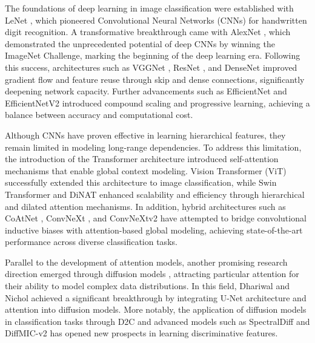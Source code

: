 \documentclass[a4paper,fleqn]{cas-sc}
\begin{document}
The foundations of deep learning in image classification were established with LeNet \cite{lecun2002gradient}, which pioneered Convolutional Neural Networks (CNNs) for handwritten digit recognition. A transformative breakthrough came with AlexNet \cite{krizhevsky2012imagenet}, which demonstrated the unprecedented potential of deep CNNs by winning the ImageNet Challenge, marking the beginning of the deep learning era. Following this success, architectures such as VGGNet \cite{donelly2012very}, ResNet \cite{he2016deep}, and DenseNet \cite{huang2017densely} improved gradient flow and feature reuse through skip and dense connections, significantly deepening network capacity. Further advancements such as EfficientNet \cite{tan2019efficientnet} and EfficientNetV2 \cite{tan2021efficientnetv2} introduced compound scaling and progressive learning, achieving a balance between accuracy and computational cost.

Although CNNs have proven effective in learning hierarchical features, they remain limited in modeling long-range dependencies. To address this limitation, the introduction of the Transformer architecture \cite{vaswani2017attention} introduced self-attention mechanisms that enable global context modeling. Vision Transformer (ViT) \cite{dosovitskiy2021an} successfully extended this architecture to image classification, while Swin Transformer \cite{liu2021swin} and DiNAT \cite{hussein2023dilated} enhanced scalability and efficiency through hierarchical and dilated attention mechanisms. In addition, hybrid architectures such as CoAtNet \cite{dai2021coatnet}, ConvNeXt \cite{liu2022convnet}, and ConvNeXtv2 \cite{woo2023convnext} have attempted to bridge convolutional inductive biases with attention-based global modeling, achieving state-of-the-art performance across diverse classification tasks.

Parallel to the development of attention models, another promising research direction emerged through diffusion models \cite{ho2020denoising,dhariwal2021diffusion,chen2023spectraldiff,yang2025diffmic,de2022d2c}, attracting particular attention for their ability to model complex data distributions. In this field, Dhariwal and Nichol \cite{dhariwal2021diffusion} achieved a significant breakthrough by integrating U-Net architecture and attention into diffusion models. More notably, the application of diffusion models in classification tasks through D2C \cite{de2022d2c} and advanced models such as SpectralDiff \cite{chen2023spectraldiff} and DiffMIC-v2 \cite{yang2025diffmic} has opened new prospects in learning discriminative features. 
\end{document}
